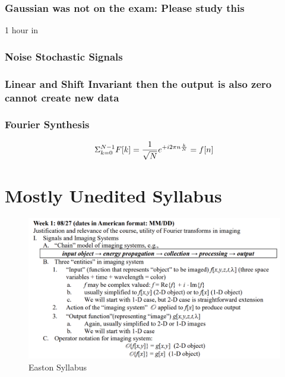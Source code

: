 \documentclass{article}
\begin{document}
\subsubsection{Gaussian was not on the exam: Please study this} 
1 hour in

\subsubsection{Noise Stochastic Signals}

\subsubsection{Linear and Shift Invariant then the output is also zero cannot create new data}
\subsubsection{Fourier Synthesis}

\begin{equation}
    \huge\Sigma^{N-1}_{k=0} F[k]= \frac{1}{\sqrt{N}}e^{+i 2 \pi n \frac{k}{N}}= f[n]
\end{equation}




\clearpage
\section{Mostly Unedited Syllabus}
\begin{figure}[h!]
\centering
\includegraphics[scale=.60]{Fourier/Week 1/Week1.1.png}
\caption{Easton Syllabus}
\label{fig:Snowman1}
\end{figure}
\end{document}
